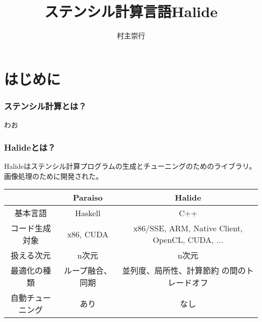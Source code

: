 \documentclass[dvipdfmx,cjk]{beamer}
\begin{document}
\title[Halide]{ステンシル計算言語Halide}
\author[T. Muranushi]{村主崇行}            %

\begin{frame}                  %
\titlepage                     %
\end{frame}

\begin{frame}                  %
\tableofcontents
\end{frame}

\section{はじめに} 

\begin{frame}\frametitle{ステンシル計算とは？}
わお
\end{frame}

\begin{frame}\frametitle{Halideとは？}
Halideはステンシル計算プログラムの生成とチューニングのためのライブラリ。
画像処理のために開発された。\cite{ragan2012decoupling,ragan2013halide}


\begin{center}
  \begin{tabular}{|c|c|c|}
    \hline
    &Paraiso & Halide\\
    \hline
    基本言語 & Haskell & C++ \\
    コード生成対象 & x86, CUDA &
    \multicolumn{1}{p{5cm}|}{x86/SSE, ARM, Native Client, OpenCL, CUDA,  ... }\\
    扱える次元 & n次元 & n次元 \\ 
    最適化の種類 & ループ融合、同期 & \multicolumn{1}{p{5cm}|}{並列度、局所性、計算節約 の間のトレードオフ} \\ 
    自動チューニング & あり & なし \\ 
    \hline
  \end{tabular}
\end{center}
\end{frame}
\end{document}

